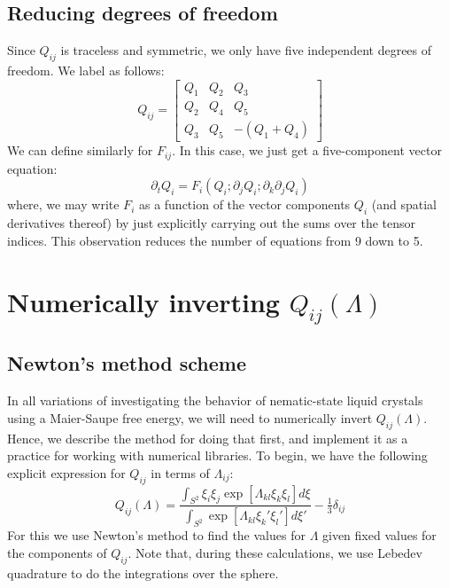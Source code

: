 \documentclass[reqno]{article}
\begin{document}
	\subsection{Reducing degrees of freedom}
	Since $Q_{ij}$ is traceless and symmetric, we only have five independent degrees of freedom.
	We label as follows:
	\begin{equation}
	Q_{ij}
	= \begin{bmatrix}
	Q_1 & Q_2 & Q_3 \\
	Q_2 & Q_4 & Q_5 \\
	Q_3 & Q_5 & -(Q_1 + Q_4)
	\end{bmatrix}
	\end{equation}
	We can define similarly for $F_{ij}$.
	In this case, we just get a five-component vector equation:
	\begin{equation}
		\partial_t Q_i = F_i \left( Q_i ; \partial_j Q_i ; \partial_k \partial_j Q_i \right)
	\end{equation}
	where, we may write $F_i$ as a function of the vector components $Q_i$ (and spatial derivatives thereof) by just explicitly carrying out the sums over the tensor indices.
	This observation reduces the number of equations from 9 down to 5.
	
	\section{Numerically inverting $Q_{ij} (\Lambda)$}
	\subsection{Newton's method scheme}
	In all variations of investigating the behavior of nematic-state liquid crystals using a Maier-Saupe free energy, we will need to numerically invert $Q_{ij} (\Lambda)$.
	Hence, we describe the method for doing that first, and implement it as a practice for working with numerical libraries.
	To begin, we have the following explicit expression for $Q_{ij}$ in terms of $\Lambda_{ij}$:
	\begin{equation}
	Q_{ij} (\Lambda)
	= \frac{\int_{S^2} \xi_i \xi_j \exp\left[\Lambda_{kl} \xi_k \xi_l \right] d \xi}
	{\int_{S^2} \exp\left[\Lambda_{kl} \xi_k' \xi_l'\right] d\xi'}
	- \tfrac13 \delta_{ij}
	\end{equation}
	For this we use Newton's method to find the values for $\Lambda$ given fixed values for the components of $Q_{ij}$.
	Note that, during these calculations, we use Lebedev quadrature to do the integrations over the sphere.
	
\end{document}
